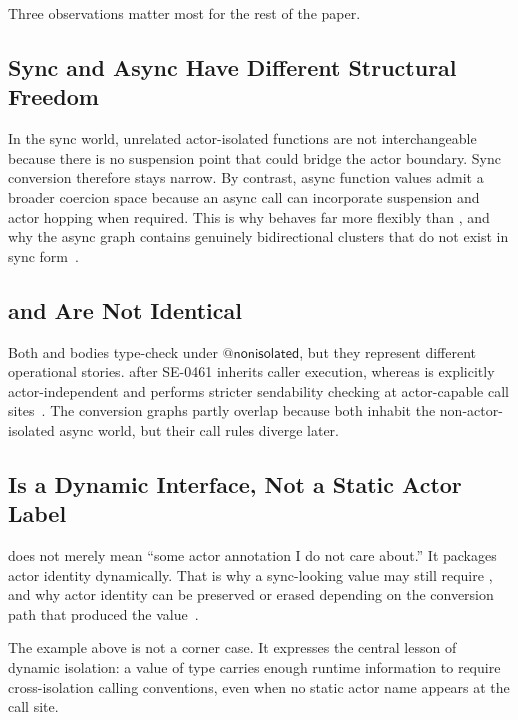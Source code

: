 Three observations matter most for the rest of the paper.

\subsection{Sync and Async Have Different Structural Freedom}

In the sync world, unrelated actor-isolated functions are not interchangeable because there is no suspension point that could bridge the actor boundary. Sync conversion therefore stays narrow. By contrast, async function values admit a broader coercion space because an async call can incorporate suspension and actor hopping when required. This is why  behaves far more flexibly than , and why the async graph contains genuinely bidirectional clusters that do not exist in sync form~\cite{se0431,se0461}.

\subsection{ and  Are Not Identical}

Both  and  bodies type-check under $@\textsf{nonisolated}$, but they represent different operational stories.  after SE-0461 inherits caller execution, whereas  is explicitly actor-independent and performs stricter sendability checking at actor-capable call sites~\cite{se0461}. The conversion graphs partly overlap because both inhabit the non-actor-isolated async world, but their call rules diverge later.

\subsection{ Is a Dynamic Interface, Not a Static Actor Label}

 does not merely mean ``some actor annotation I do not care about.'' It packages actor identity dynamically. That is why a sync-looking  value may still require , and why actor identity can be preserved or erased depending on the conversion path that produced the value~\cite{se0431}.


The example above is not a corner case. It expresses the central lesson of dynamic isolation: a value of type  carries enough runtime information to require cross-isolation calling conventions, even when no static actor name appears at the call site.

